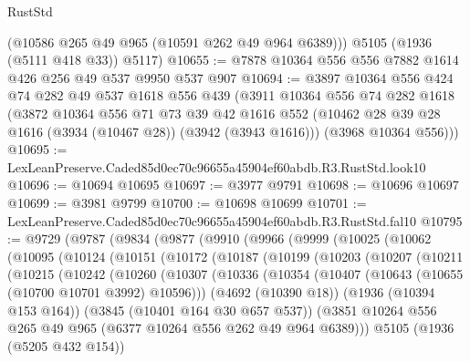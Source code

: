 \begin{lexlean}{RustStd}
\begin{coremodule}
        (@10586 @265 @49 @965 (@10591 @262 @49 @964 @6389)))
      @5105
      (@1936 (@5111 @418 @33))
      @5117)
@10655 := @7878 @10364 @556 @556 @7882 @1614 @426 @256 @49 @537 @9950 @537 @907
@10694 := @3897
    @10364
    @556
    @424
    @74
    @282
    @49
    @537
    @1618
    @556
    @439
    (@3911
      @10364
      @556
      @74
      @282
      @1618
      (@3872
        @10364
        @556
        @71
        @73
        @39
        @42
        @1616
        @552
        (@10462 @28 @39 @28 @1616 (@3934 (@10467 @28)) (@3942 (@3943 @1616)))
        (@3968 @10364 @556)))
@10695 := LexLeanPreserve.Caded85d0ec70c96655a45904ef60abdb.R3.RustStd.look10
@10696 := @10694 @10695
@10697 := @3977 @9791
@10698 := @10696 @10697
@10699 := @3981 @9799
@10700 := @10698 @10699
@10701 := LexLeanPreserve.Caded85d0ec70c96655a45904ef60abdb.R3.RustStd.fal10
@10795 := @9729
    (@9787
      (@9834
        (@9877
          (@9910
            (@9966
              (@9999
                (@10025
                  (@10062
                    (@10095
                      (@10124
                        (@10151
                          (@10172
                            (@10187
                              (@10199
                                (@10203
                                  (@10207
                                    (@10211
                                      (@10215
                                        (@10242
                                          (@10260
                                            (@10307
                                              (@10336
                                                (@10354
                                                  (@10407
                                                    (@10643 (@10655 (@10700 @10701 @3992) @10596)))
                                                  (@4692 (@10390 @18))
                                                  (@1936 (@10394 @153 @164))
                                                  (@3845 (@10401 @164 @30 @657 @537))
                                                  (@3851
                                                    @10264
                                                    @556
                                                    @265
                                                    @49
                                                    @965
                                                    (@6377 @10264 @556 @262 @49 @964 @6389)))
                                                @5105
                                                (@1936 (@5205 @432 @154))

\end{coremodule}
\end{lexlean}
